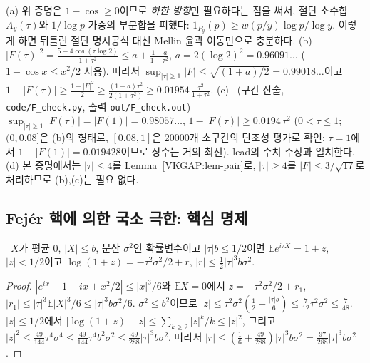 \begin{remark}\label{VKGAP:rem-F}
(a) 위 증명은 $1-\cos\ge0$이므로 \emph{하한 방향}만 필요하다는 점을 써서, 절단 소수합 $A_y(\tau)$와 $1/\log p$ 가중의 부분합을
피했다: $1_{P_y}(p)\ge w(p/y)\log p/\log y$. 이렇게 하면 뒤틀린 절단 명시공식 대신 Mellin 윤곽 이동만으로 충분하다.
(b) \PROVED\ $|F(\tau)|^2=\frac{5-4\cos(\tau\log2)}{1+\tau^2}\le a+\frac{1-a}{1+\tau^2}$, $a=2(\log2)^2=0.96091\ldots$
($1-\cos x\le x^2/2$ 사용). 따라서 $\sup_{|\tau|\ge1}|F|\le\sqrt{(1+a)/2}=0.99018\ldots$이고
$1-|F(\tau)|\ge\frac{1-|F|^2}{2}\ge\frac{(1-a)\tau^2}{2(1+\tau^2)}\ge 0.01954\,\frac{\tau^2}{1+\tau^2}$.
(c) \NUMERIC\ (구간 산술, \texttt{code/F\_check.py}, 출력 \texttt{out/F\_check.out}) $\sup_{|\tau|\ge1}|F(\tau)|=|F(1)|=0.98057\ldots$,
$1-|F(\tau)|\ge0.0194\,\tau^2$ ($0<\tau\le1$; $(0,0.08]$은 (b)의 형태로, $[0.08,1]$은 20000개 소구간의 단조성 평가로 확인; $\tau=1$에서 $1-|F(1)|=0.019428$이므로 상수는 거의 최선). lead의 수치 주장과 일치한다.
(d) 본 증명에서는 $|\tau|\le4$를 Lemma~\ref{VKGAP:lem-pair}로, $|\tau|\ge4$를 $|F|\le3/\sqrt{17}$로 처리하므로 (b),(c)는 필요 없다.
\end{remark}

\subsection{Fejér 핵에 의한 국소 극한: 핵심 명제}
\label{VKGAP:sec-core}

\begin{lemma}\label{VKGAP:lem-cumulant}
\PROVED\ $X$가 평균 $0$, $|X|\le b$, 분산 $\sigma^2$인 확률변수이고 $|\tau|b\le1/2$이면
$\mathbb{E}e^{i\tau X}=1+z$, $|z|<1/2$이고 $\log(1+z)=-\tau^2\sigma^2/2+r$, $|r|\le\frac12|\tau|^3b\sigma^2$.
\end{lemma}
\begin{proof}
$|e^{ix}-1-ix+x^2/2|\le|x|^3/6$와 $\mathbb{E}X=0$에서 $z=-\tau^2\sigma^2/2+r_1$, $|r_1|\le|\tau|^3\mathbb{E}|X|^3/6\le|\tau|^3b\sigma^2/6$.
$\sigma^2\le b^2$이므로 $|z|\le\tau^2\sigma^2(\frac12+\frac{|\tau|b}{6})\le\frac7{12}\tau^2\sigma^2\le\frac{7}{48}$.
$|z|\le1/2$에서 $|\log(1+z)-z|\le\sum_{k\ge2}|z|^k/k\le|z|^2$, 그리고
$|z|^2\le\frac{49}{144}\tau^4\sigma^4\le\frac{49}{144}\tau^4b^2\sigma^2\le\frac{49}{288}|\tau|^3b\sigma^2$.
따라서 $|r|\le(\frac16+\frac{49}{288})|\tau|^3b\sigma^2=\frac{97}{288}|\tau|^3b\sigma^2$.
\end{proof}

